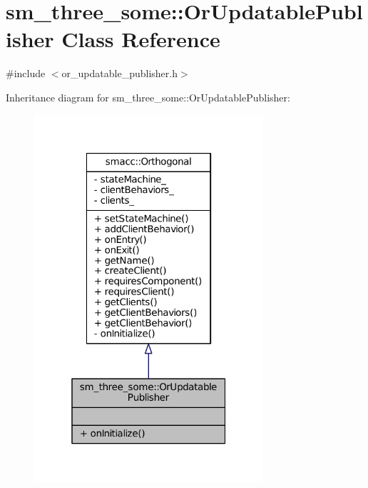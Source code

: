 \hypertarget{classsm__three__some_1_1OrUpdatablePublisher}{}\section{sm\+\_\+three\+\_\+some\+:\+:Or\+Updatable\+Publisher Class Reference}
\label{classsm__three__some_1_1OrUpdatablePublisher}


{\ttfamily \#include $<$or\+\_\+updatable\+\_\+publisher.\+h$>$}



Inheritance diagram for sm\+\_\+three\+\_\+some\+:\+:Or\+Updatable\+Publisher\+:
\nopagebreak
\begin{figure}[H]
\begin{center}
\leavevmode
\includegraphics[width=241pt]{classsm__three__some_1_1OrUpdatablePublisher__inherit__graph}
\end{center}
\end{figure}


